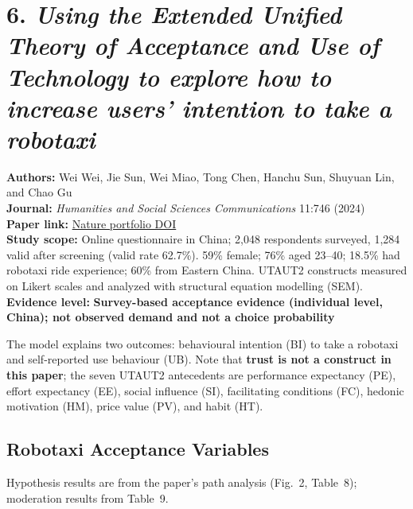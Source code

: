 \documentclass[10pt,a4paper]{article}
\begin{document}
\hypertarget{using-the-extended-unified-theory-of-acceptance-and-use-of-technology}{%
\section{\texorpdfstring{6. \emph{Using the Extended Unified Theory of Acceptance and Use of Technology to explore how to increase users' intention to take a robotaxi}}{6. Using the Extended Unified Theory of Acceptance and Use of Technology to explore how to increase users' intention to take a robotaxi}}\label{using-the-extended-unified-theory-of-acceptance-and-use-of-technology}}

\textbf{Authors:} Wei Wei, Jie Sun, Wei Miao, Tong Chen, Hanchu Sun, Shuyuan Lin, and Chao Gu\\
\textbf{Journal:} \emph{Humanities and Social Sciences Communications} 11:746 (2024)\\
\textbf{Paper link:} \href{https://doi.org/10.1057/s41599-024-03271-3}{Nature portfolio DOI}\\
\textbf{Study scope:} Online questionnaire in China; 2,048 respondents surveyed, 1,284 valid after screening (valid rate 62.7\%). 59\% female; 76\% aged 23--40; 18.5\% had robotaxi ride experience; 60\% from Eastern China. UTAUT2 constructs measured on Likert scales and analyzed with structural equation modelling (SEM).\\
\textbf{Evidence level:} \textbf{Survey-based acceptance evidence (individual level, China); not observed demand and not a choice probability}

The model explains two outcomes: behavioural intention (BI) to take a robotaxi and self-reported use behaviour (UB). Note that \textbf{trust is not a construct in this paper}; the seven UTAUT2 antecedents are performance expectancy (PE), effort expectancy (EE), social influence (SI), facilitating conditions (FC), hedonic motivation (HM), price value (PV), and habit (HT).

\hypertarget{robotaxi-acceptance-variables}{%
\subsection{Robotaxi Acceptance Variables}\label{robotaxi-acceptance-variables}}

Hypothesis results are from the paper's path analysis (Fig.~2, Table~8); moderation results from Table~9.
\end{document}
